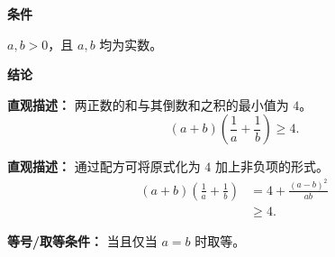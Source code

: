 \begin{statementbox}
	\textbf{\textcolor{CStatement}{条件}}
	\begin{description}[style=nextline, leftmargin=2.8em, labelsep=0.5em, itemsep=0.35em]
		\item[\textbf{\textcolor{CStatement}{条件 1（正实数）：}}]
			$a,b > 0$，且 $a,b$ 均为实数。
	\end{description}

	\medskip
	\textbf{\textcolor{CStatement}{结论}}
	\begin{description}[style=nextline, leftmargin=2.8em, labelsep=0.5em, itemsep=0.45em]
		\item[\textbf{\textcolor{CStatement}{结论一（最小值结论）：}}]
			\textbf{\textcolor{CStatement}{直观描述：}}
			两正数的和与其倒数和之积的最小值为 $4$。
			\[
				(a+b)\left(\frac{1}{a}+\frac{1}{b}\right) \ge 4.
			\]
		\item[\textbf{\textcolor{CStatement}{推广结论（恒等变形）：}}]
			\textbf{\textcolor{CStatement}{直观描述：}}
			通过配方可将原式化为 $4$ 加上非负项的形式。
			\[
				\begin{aligned}
					(a+b)\left(\frac{1}{a}+\frac{1}{b}\right) &= 4 + \frac{(a-b)^2}{ab} \\ &\ge 4.
			\end{aligned}
			\]
	\end{description}

	\medskip
	\textbf{\textcolor{CStatement}{等号/取等条件：}}
	当且仅当 $a=b$ 时取等。
\end{statementbox}

